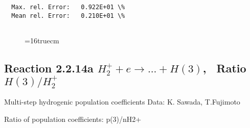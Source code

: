 \documentclass[12pt,dvipdfmx]{article}
\begin{document}
\begin{small}
\begin{verbatim}
  Max. rel. Error:   0.922E+01 \%
  Mean rel. Error:   0.210E+01 \%


\end{verbatim}\end{small}
\begin{figure} \label{2.2.5ly}
\epsfxsize=16truecm
\end{figure}

\newpage
\subsection{
Reaction 2.2.14a $ H_2^+ + e \rightarrow ...+ H(3) $, \  Ratio $H(3)/H_2^+ $
}

 Multi-step hydrogenic population coefficients
 Data: K. Sawada, T.Fujimoto \cite{kn:Sawada}

 Ratio of population coefficients: p(3)/nH2+
\end{document}

